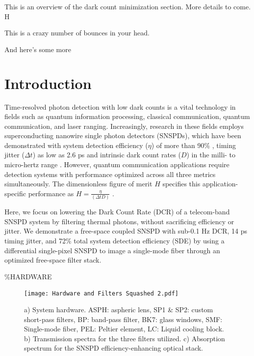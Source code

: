 \documentclass[12pt]{caltech_thesis}
\begin{document}
This is an overview of the dark count minimization section. More details
to come. H

This is a crazy number of bounces in your head.

And here's some more

\hypertarget{introduction}{%
\section{Introduction}\label{introduction}}

Time-resolved photon detection with low dark counts is a vital
technology in fields such as quantum information processing, classical
communication, quantum communication, and laser ranging. Increasingly,
research in these fields employs superconducting nanowire single photon
detectors (SNSPDs), which have been demonstrated with system detection
efficiency (\(\eta\)) of more than 90\% \autocite{Reddy2020}, timing
jitter (\(\Delta t\)) as low as 2.6 ps \autocite{Korzh2020} and
intrinsic dark count rates (\(D\)) in the milli- to micro-hertz range
\autocite{Hochberg2019}. However, quantum communication applications
require detection systems with performance optimized across all three
metrics simultaneously. The dimensionless figure of merit \(H\)
specifies this application-specific performance as
\(H = \frac{\eta}{(\Delta t D)}\) \autocite{Hadfield2009}.

Here, we focus on lowering the Dark Count Rate (DCR) of a telecom-band
SNSPD system by filtering thermal photons, without sacrificing
efficiency or jitter. We demonstrate a free-space coupled SNSPD with
sub-0.1 Hz DCR, 14 ps timing jitter, and 72\% total system detection
efficiency (SDE) by using a differential single-pixel SNSPD
\autocite{Colangelo2021} to image a single-mode fiber through an
optimized free-space filter stack.

\%HARDWARE

\begin{figure}[htbp]
\centering\texttt{[image: Hardware and Filters Squashed 2.pdf]}
\caption{\small a) System hardware. ASPH: aspheric lens, %
SP1 \& SP2: custom short-pass filters, BP: band-pass filter, %
BK7: glass windows, SMF: Single-mode fiber, PEL: Peltier element, LC: Liquid cooling block. b) Transmission spectra for the three filters utilized. c) Absorption spectrum for the SNSPD efficiency-enhancing optical stack.}
\label{fig:setup}
\end{figure}
\end{document}
